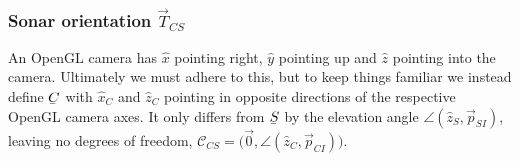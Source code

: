 %


\subsubsection{Sonar orientation \texorpdfstring{$\vec{T}_{CS}$}{T\_CS}}

%


An OpenGL camera has $\hat{x}$ pointing right, $\hat{y}$ pointing up and $\hat{z}$ pointing into the camera. Ultimately we must adhere to this, but to keep things familiar we instead define $\ubar{C}$ with $\hat{x}_C$ and $\hat{z}_C$ pointing in opposite directions of the respective OpenGL camera axes. It only differs from $\ubar{S}$ by the elevation angle $\angle(\hat{z}_S,\vec{p}_{SI})$, leaving no degrees of freedom, $\mathcal{C}_{CS} = \big(\vec{0},\angle(\hat{z}_C,\vec{p}_{CI})\big)$.
%
%
%
%
%
%
%
%
%
%
